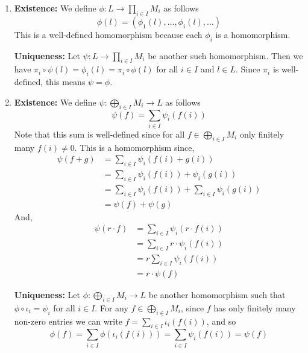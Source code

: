 \documentclass[Notebook.tex]{subfiles}
\begin{document}
    \begin{solution}
        \bbni
        \begin{enumerate}
            \item \textbf{Existence:} We define $\phi: L \to \prod_{i \in I} M_i$ as follows 
            \[\phi(l) = (\phi_1(l), \ldots, \phi_i(l), \ldots)\]
            This is a well-defined homomorphism because each $\phi_i$ is a homomorphism. 

            \textbf{Uniqueness:} Let $\psi: L \to \prod_{i \in I}M_i$ be another such homomorphism. Then we have $\pi_i \circ \psi(l) = \phi_i(l) = \pi_i \circ \phi(l)$ for all $i \in I$ and $l \in L$. Since $\pi_i$ is well-defined, this means $\psi = \phi$. 

            \item \textbf{Existence:} We define $\psi:  \bigoplus_{i \in I} M_i \to L$ as follows 
            \[\psi(f) = \sum_{i \in I} \psi_i(f(i))\]
            Note that this sum is well-defined since for all $f \in \bigoplus_{i \in I} M_i$ only finitely many $f(i) \neq 0$. This is a homomorphism since, 
            \begin{align*}
                \psi ( f + g ) &= \sum_{i \in I} \psi_i(f(i) + g(i))  \\ 
                &= \sum_{i \in I} \psi_i(f(i)) + \psi_i(g(i)) \\ 
                &= \sum_{i \in I} \psi_i(f(i)) + \sum_{i \in I} \psi_i(g(i))  \\
                &= \psi(f) + \psi(g)
            \end{align*}
            And, 
            \begin{align*}
                 \psi ( r\cdot f ) &= \sum_{i \in I} \psi_i(r \cdot f(i))  \\ 
                &= \sum_{i \in I} r \cdot \psi_i( f(i)) \\ 
                &= r  \sum_{i \in I}  \psi_i( f(i)) \\ 
                &= r \cdot \psi(f) 
            \end{align*}


            \textbf{Uniqueness:} Let $\phi: \bigoplus_{i\in I} M_i \to L$ be another homomorphism such that $\phi \circ \iota_i = \psi_i$ for all $i \in I$. For any $f \in \bigoplus_{i \in I} M_i$, since $f$ has only finitely many non-zero entries we can write $f = \sum_{i \in I} \iota_i(f(i))$, and so
            \[\phi(f) = \sum_{i \in I} \phi(\iota_i(f(i))) = \sum_{i \in I} \psi_i(f(i)) = \psi(f)\]
            

\end{enumerate}
\end{solution}
\end{document}
